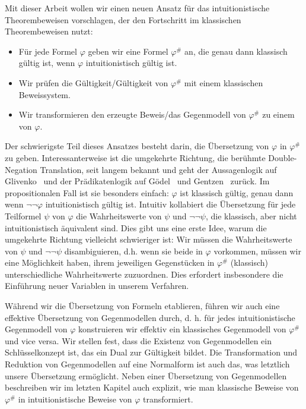 \documentclass[a4paper,11pt]{report}
\theoremstyle{definition}
\theoremstyle{definition}
\theoremstyle{definition}
\theoremstyle{definition}
\theoremstyle{definition}
\theoremstyle{definition}
\theoremstyle{definition}
\begin{document}
	Mit dieser Arbeit wollen wir einen neuen Ansatz für das intuitionistische Theorembeweisen vorschlagen, der den Fortschritt im klassischen Theorembeweisen nutzt:
	\begin{itemize}
		\item Für jede Formel $\varphi$ geben wir eine Formel $\varphi^\#$ an, die genau dann klassisch gültig ist, wenn $\varphi$ intuitionistisch gültig ist.
		\item Wir prüfen die Gültigkeit/Gültigkeit von $\varphi^\#$ mit einem klassischen Beweissystem.
		\item Wir transformieren den erzeugte Beweis/das Gegenmodell von $\varphi^\#$ zu einem von $\varphi$.
	\end{itemize}
	Der schwierigste Teil dieses Ansatzes besteht darin, die Übersetzung von $\varphi$ in $\varphi^\#$ zu geben.
	Interessanterweise ist die umgekehrte Richtung, die berühmte Double-Negation Translation, seit langem bekannt und geht der Aussagenlogik auf Glivenko~\cite{glivenko1929quelques} und der Prädikatenlogik auf G\"odel~\cite{godel1933intuitionistischen} und Gentzen~\cite{gentzen1936widerspruchsfreiheit} zurück. Im propositionalen Fall ist sie besonders einfach: $\varphi$ ist klassisch gültig, genau dann wenn $\neg\neg\varphi$ intuitionistisch gültig ist. Intuitiv kollabiert die Übersetzung für jede Teilformel $\psi$ von $\varphi$ die Wahrheitswerte von $\psi$ und $\neg\neg\psi$, die klassisch, aber nicht intuitionistisch äquivalent sind. Dies gibt uns eine erste Idee, warum die umgekehrte Richtung vielleicht schwieriger ist: Wir müssen die Wahrheitswerte von $\psi$ und $\neg\neg\psi$ disambiguieren, d.h. wenn sie beide in $\varphi$ vorkommen, müssen wir eine Möglichkeit haben, ihrem jeweiligen Gegenstücken in $\varphi^\#$ (klassisch) unterschiedliche Wahrheitswerte zuzuordnen. Dies erfordert insbesondere die Einführung neuer Variablen in unserem Verfahren.
	
	Während wir die Übersetzung von Formeln etablieren, führen wir auch eine effektive Übersetzung von Gegenmodellen durch, d. h. für jedes intuitionistische Gegenmodell von $\varphi$ konstruieren wir effektiv ein klassisches Gegenmodell von $\varphi^\#$ und vice versa.
	Wir stellen fest, dass die Existenz von Gegenmodellen ein Schlüsselkonzept ist, das ein Dual zur Gültigkeit bildet.
	Die Transformation und Reduktion von Gegenmodellen auf eine Normalform ist auch das, was letztlich unsere Übersetzung ermöglicht. Neben einer Übersetzung von Gegenmodellen beschreiben wir im letzten Kapitel auch explizit, wie man klassische Beweise von $\varphi^\#$ in intuitionistische Beweise von $\varphi$ transformiert.
	
\end{document}
